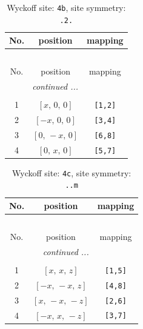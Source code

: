 \documentclass[fleqn,8pt]{jsarticle}
\begin{document}
\begin{longtable}{ccc}
\caption{Wyckoff site: {\tt 4b}, site symmetry: {\tt .2.}}
 \\
 \hline \hline
No. & position & mapping \\ \hline \endfirsthead

\multicolumn{2}{l}{\tablename\ \thetable{}} \\
 \hline \hline
No. & position & mapping \\ \hline \endhead

 \hline \hline
\multicolumn{2}{r}{\footnotesize\it continued ...} \\ \endfoot

 \hline \hline
\multicolumn{2}{r}{} \\ \endlastfoot

1 & $\left[ x,\, 0,\, 0 \right]$ & {\tt [1,2]} \\ \hline
2 & $\left[ - x,\, 0,\, 0 \right]$ & {\tt [3,4]} \\ \hline
3 & $\left[ 0,\, - x,\, 0 \right]$ & {\tt [6,8]} \\ \hline
4 & $\left[ 0,\, x,\, 0 \right]$ & {\tt [5,7]} \\
\end{longtable}
\renewcommand{\arraystretch}{1.2}
\begin{longtable}{ccc}
\caption{Wyckoff site: {\tt 4c}, site symmetry: {\tt ..m}}
 \\
 \hline \hline
No. & position & mapping \\ \hline \endfirsthead

\multicolumn{2}{l}{\tablename\ \thetable{}} \\
 \hline \hline
No. & position & mapping \\ \hline \endhead

 \hline \hline
\multicolumn{2}{r}{\footnotesize\it continued ...} \\ \endfoot

 \hline \hline
\multicolumn{2}{r}{} \\ \endlastfoot

1 & $\left[ x,\, x,\, z \right]$ & {\tt [1,5]} \\ \hline
2 & $\left[ - x,\, - x,\, z \right]$ & {\tt [4,8]} \\ \hline
3 & $\left[ x,\, - x,\, - z \right]$ & {\tt [2,6]} \\ \hline
4 & $\left[ - x,\, x,\, - z \right]$ & {\tt [3,7]} \\
\end{longtable}
\renewcommand{\arraystretch}{1.2}
\end{document}
